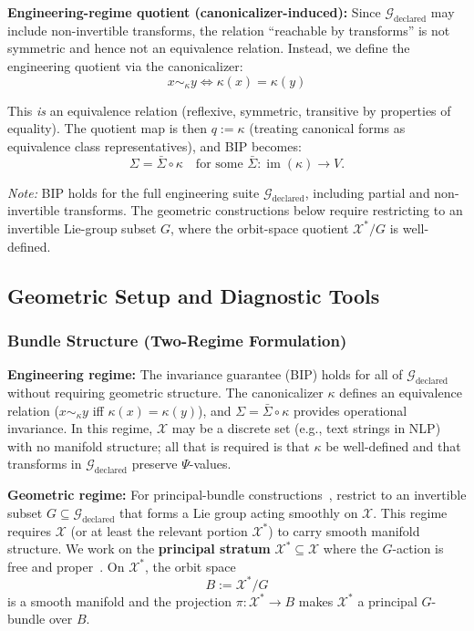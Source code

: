 \documentclass[12pt]{article}
\begin{document}
\textbf{Engineering-regime quotient (canonicalizer-induced):} Since $\mathcal{G}_{\text{declared}}$ may include non-invertible transforms, the relation ``reachable by transforms'' is not symmetric and hence not an
equivalence relation. Instead, we define the engineering quotient via the canonicalizer:
\[
x \sim_\kappa y \iff \kappa(x) = \kappa(y)
\]

This \emph{is} an equivalence relation (reflexive, symmetric, transitive by properties of equality). The
quotient map is then $q := \kappa$ (treating canonical forms as equivalence class representatives), and
BIP becomes:
\[
\Sigma = \bar{\Sigma} \circ \kappa \quad \text{for some } \bar{\Sigma} : \operatorname{im}(\kappa) \to V.
\]

\emph{Note:} BIP holds for the full engineering suite $\mathcal{G}_{\text{declared}}$, including partial and non-invertible
transforms. The geometric constructions below require restricting to an invertible Lie-group subset
$G$, where the orbit-space quotient $\mathcal{X}^*/G$ is well-defined.

\subsection{Geometric Setup and Diagnostic Tools}

\subsubsection{Bundle Structure (Two-Regime Formulation)}

\textbf{Engineering regime:} The invariance guarantee (BIP) holds for all of $\mathcal{G}_{\text{declared}}$ without requiring
geometric structure. The canonicalizer $\kappa$ defines an equivalence relation ($x \sim_\kappa y$ iff $\kappa(x) = \kappa(y)$),
and $\Sigma = \bar{\Sigma} \circ \kappa$ provides operational invariance. In this regime, $\mathcal{X}$ may be a discrete set (e.g., text
strings in NLP) with no manifold structure; all that is required is that $\kappa$ be well-defined and that
transforms in $\mathcal{G}_{\text{declared}}$ preserve $\Psi$-values.

\textbf{Geometric regime:} For principal-bundle constructions~\cite{kobayashi1963,nakahara2003}, restrict to an invertible subset
$G \subseteq \mathcal{G}_{\text{declared}}$ that forms a Lie group acting smoothly on $\mathcal{X}$. This regime requires $\mathcal{X}$ (or at least
the relevant portion $\mathcal{X}^*$) to carry smooth manifold structure. We work on the \textbf{principal stratum}
$\mathcal{X}^* \subseteq \mathcal{X}$ where the $G$-action is free and proper~\cite{pflaum2001}. On $\mathcal{X}^*$, the orbit space
\[
B := \mathcal{X}^*/G
\]
is a smooth manifold and the projection $\pi : \mathcal{X}^* \to B$ makes $\mathcal{X}^*$ a principal $G$-bundle over $B$.
\end{document}
